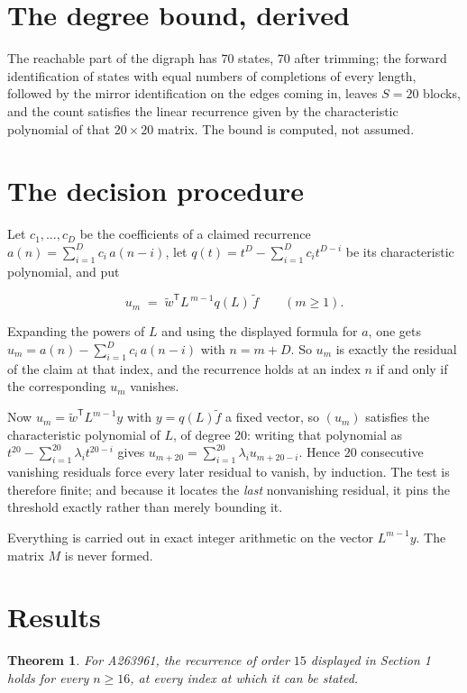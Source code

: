 \documentclass[11pt]{article}
\newtheorem{theorem}{Theorem}
\theoremstyle{definition}
\begin{document}
\section{The degree bound, derived}

The reachable part of the digraph has $70$ states, $70$ after trimming; the forward identification of states with equal numbers of completions of every length, followed by the mirror identification on the edges coming in, leaves $S = 20$ blocks, and the count satisfies the linear recurrence given by the characteristic polynomial of that $20\times20$ matrix. The bound is computed, not assumed.

\section{The decision procedure}

Let $c_1,\dots,c_D$ be the coefficients of a claimed recurrence $a(n) = \sum_{i=1}^{D} c_i\,a(n-i)$, let $q(t) = t^{D} - \sum_{i=1}^{D} c_i t^{D-i}$ be its characteristic polynomial, and put

\[u_m \;=\; \tilde w^{\mathsf T} L^{\,m-1} q(L)\,\tilde f \qquad (m \ge 1).\]

Expanding the powers of $L$ and using the displayed formula for $a$, one gets $u_m = a(n) - \sum_{i=1}^{D} c_i\,a(n-i)$ with $n = m + D$. So $u_m$ is exactly the residual of the claim at that index, and the recurrence holds at an index $n$ if and only if the corresponding $u_m$ vanishes.

Now $u_m = \tilde w^{\mathsf T} L^{m-1} y$ with $y = q(L)\tilde f$ a fixed vector, so $(u_m)$ satisfies the characteristic polynomial of $L$, of degree $20$: writing that polynomial as $t^{20} - \sum_{i=1}^{20} \lambda_i t^{20-i}$ gives $u_{m+20} = \sum_{i=1}^{20} \lambda_i u_{m+20-i}$. Hence $20$ consecutive vanishing residuals force every later residual to vanish, by induction. The test is therefore finite; and because it locates the {\itshape last} nonvanishing residual, it pins the threshold exactly rather than merely bounding it.

Everything is carried out in exact integer arithmetic on the vector $L^{m-1}y$. The matrix $M$ is never formed.

\section{Results}

\begin{theorem} For A263961, the recurrence of order $15$ displayed in Section 1 holds for every $n \ge 16$, at every index at which it can be stated.\end{theorem}
\end{document}
